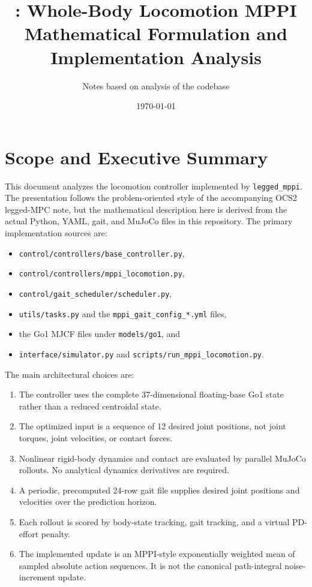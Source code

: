 \documentclass[11pt,a4paper]{article}
\title{\code{legged\_mppi}: Whole-Body Locomotion MPPI\\
Mathematical Formulation and Implementation Analysis}
\author{Notes based on analysis of the \code{legged\_mppi} codebase}
\date{\today}
\newcommand{\code}[1]{\texttt{#1}}
\begin{document}
\maketitle
\tableofcontents
\newpage

\section{Scope and Executive Summary}

This document analyzes the locomotion controller implemented by
\code{legged\_mppi}.  The presentation follows the problem-oriented style of
the accompanying OCS2 legged-MPC note, but the mathematical description here
is derived from the actual Python, YAML, gait, and MuJoCo files in this
repository.  The primary implementation sources are:
\begin{itemize}
  \item \code{control/controllers/base\_controller.py},
  \item \code{control/controllers/mppi\_locomotion.py},
  \item \code{control/gait\_scheduler/scheduler.py},
  \item \code{utils/tasks.py} and the \code{mppi\_gait\_config\_*.yml} files,
  \item the Go1 MJCF files under \code{models/go1}, and
  \item \code{interface/simulator.py} and
        \code{scripts/run\_mppi\_locomotion.py}.
\end{itemize}

The main architectural choices are:
\begin{enumerate}
  \item The controller uses the complete 37-dimensional floating-base Go1
        state rather than a reduced centroidal state.
  \item The optimized input is a sequence of 12 desired joint positions, not
        joint torques, joint velocities, or contact forces.
  \item Nonlinear rigid-body dynamics and contact are evaluated by parallel
        MuJoCo rollouts.  No analytical dynamics derivatives are required.
  \item A periodic, precomputed 24-row gait file supplies desired joint
        positions and velocities over the prediction horizon.
  \item Each rollout is scored by body-state tracking, gait tracking, and a
        virtual PD-effort penalty.
  \item The implemented update is an MPPI-style exponentially weighted mean
        of sampled absolute action sequences.  It is not the canonical
        path-integral noise-increment update.
\end{enumerate}
\end{document}
